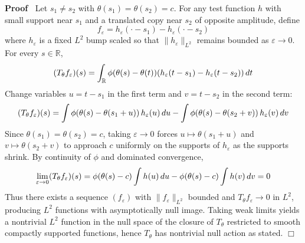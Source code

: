 \documentclass{article}
\newcommand{\cdummy}{\cdot}
\newenvironment{proof}{\noindent\textbf{Proof\ }}{\hspace*{\fill}$\Box$\medskip}
{\theorembodyfont{\rmfamily}\newtheorem{example}{Example}}
\begin{document}
\begin{proof}
  Let $s_1 \neq s_2$ with $\theta (s_1) = \theta (s_2) = c$. For any test
  function $h$ with small support near $s_1$ and a translated copy near $s_2$
  of opposite amplitude, define
  \begin{equation}
    f_{\varepsilon} = h_{\varepsilon}  (\cdummy - s_1) - h_{\varepsilon} 
    (\cdummy - s_2)
  \end{equation}
  where $h_{\varepsilon}$ is a fixed $L^2$ bump scaled so that
  $\|h_{\varepsilon} \|_{L^2}$ remains bounded as $\varepsilon \to 0$. For
  every $s \in \mathbb{R}$,
  \begin{equation}
    (T_{\theta} f_{\varepsilon}) (s) = \int_{\mathbb{R}} \phi (\theta (s) -
    \theta (t))  (h_{\varepsilon} (t - s_1) - h_{\varepsilon} (t - s_2)) 
    \hspace{0.17em} dt
  \end{equation}
  Change variables $u = t - s_1$ in the first term and $v = t - s_2$ in the
  second term:
  \begin{equation}
    (T_{\theta} f_{\varepsilon}) (s) = \int \phi (\theta (s) - \theta (s_1 +
    u))  \hspace{0.17em} h_{\varepsilon} (u)  \hspace{0.17em} du - \int \phi
    (\theta (s) - \theta (s_2 + v))  \hspace{0.17em} h_{\varepsilon} (v) 
    \hspace{0.17em} dv
  \end{equation}
  Since $\theta (s_1) = \theta (s_2) = c$, taking $\varepsilon \to 0$ forces
  $u \mapsto \theta (s_1 + u)$ and $v \mapsto \theta (s_2 + v)$ to approach
  $c$ uniformly on the supports of $h_{\varepsilon}$ as the supports shrink.
  By continuity of $\phi$ and dominated convergence,
  \begin{equation}
    \lim_{\varepsilon \to 0} (T_{\theta} f_{\varepsilon}) (s) = \phi (\theta
    (s) - c)  \int h (u)  \hspace{0.17em} du - \phi (\theta (s) - c)  \int h
    (v)  \hspace{0.17em} dv = 0
  \end{equation}
  Thus there exists a sequence $(f_{\varepsilon})$ with $\|f_{\varepsilon}
  \|_{L^2}$ bounded and $T_{\theta} f_{\varepsilon} \to 0$ in $L^2$, producing
  $L^2$ functions with asymptotically null image. Taking weak limits yields a
  nontrivial $L^2$ function in the null space of the closure of $T_{\theta}$
  restricted to smooth compactly supported functions, hence $T_{\theta}$ has
  nontrivial null action as stated.
\end{proof}
\end{document}
